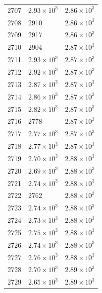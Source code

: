 \begin{table}[H]
\begin{tabular}{lll}
2707 & $\displaystyle 2.93 \times 10^{3}$ & $\displaystyle 2.86 \times 10^{3}$ \\
2708 & 2910 & $\displaystyle 2.86 \times 10^{3}$ \\
2709 & 2917 & $\displaystyle 2.86 \times 10^{3}$ \\
2710 & 2904 & $\displaystyle 2.87 \times 10^{3}$ \\
2711 & $\displaystyle 2.93 \times 10^{3}$ & $\displaystyle 2.87 \times 10^{3}$ \\
2712 & $\displaystyle 2.92 \times 10^{3}$ & $\displaystyle 2.87 \times 10^{3}$ \\
2713 & $\displaystyle 2.87 \times 10^{3}$ & $\displaystyle 2.87 \times 10^{3}$ \\
2714 & $\displaystyle 2.86 \times 10^{3}$ & $\displaystyle 2.87 \times 10^{3}$ \\
2715 & $\displaystyle 2.82 \times 10^{3}$ & $\displaystyle 2.87 \times 10^{3}$ \\
2716 & 2778 & $\displaystyle 2.87 \times 10^{3}$ \\
2717 & $\displaystyle 2.77 \times 10^{3}$ & $\displaystyle 2.87 \times 10^{3}$ \\
2718 & $\displaystyle 2.77 \times 10^{3}$ & $\displaystyle 2.87 \times 10^{3}$ \\
2719 & $\displaystyle 2.70 \times 10^{3}$ & $\displaystyle 2.88 \times 10^{3}$ \\
2720 & $\displaystyle 2.69 \times 10^{3}$ & $\displaystyle 2.88 \times 10^{3}$ \\
2721 & $\displaystyle 2.74 \times 10^{3}$ & $\displaystyle 2.88 \times 10^{3}$ \\
2722 & 2762 & $\displaystyle 2.88 \times 10^{3}$ \\
2723 & $\displaystyle 2.74 \times 10^{3}$ & $\displaystyle 2.88 \times 10^{3}$ \\
2724 & $\displaystyle 2.73 \times 10^{3}$ & $\displaystyle 2.88 \times 10^{3}$ \\
2725 & $\displaystyle 2.75 \times 10^{3}$ & $\displaystyle 2.88 \times 10^{3}$ \\
2726 & $\displaystyle 2.74 \times 10^{3}$ & $\displaystyle 2.88 \times 10^{3}$ \\
2727 & $\displaystyle 2.76 \times 10^{3}$ & $\displaystyle 2.88 \times 10^{3}$ \\
2728 & $\displaystyle 2.70 \times 10^{3}$ & $\displaystyle 2.89 \times 10^{3}$ \\
2729 & $\displaystyle 2.65 \times 10^{3}$ & $\displaystyle 2.89 \times 10^{3}$ \\

\end{tabular}
\end{table}
